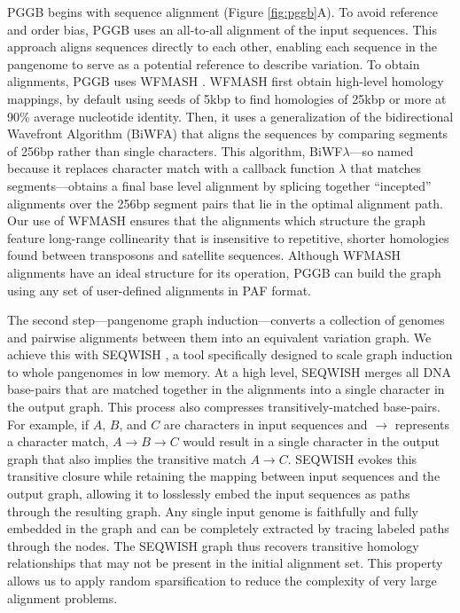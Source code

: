 \documentclass[pdflatex,mathphys]{jnl}%
\theoremstyle{thmstyleone}%
\theoremstyle{thmstyletwo}%
\theoremstyle{thmstylethree}%
\begin{document}
PGGB begins with sequence alignment (Figure \ref{fig:pggb}A).
To avoid reference and order bias, PGGB uses an all-to-all alignment of the input sequences.
This approach aligns sequences directly to each other, enabling each sequence in the pangenome to serve as a potential reference to describe variation.
To obtain alignments, PGGB uses WFMASH \cite{Guarracino_wfmash_2021}.
WFMASH first %
obtain high-level homology mappings, by default using seeds of 5kbp to find homologies of 25kbp or more at 90\% average nucleotide identity.
Then, it uses a generalization of the bidirectional Wavefront Algorithm (BiWFA) \cite{Marco_Sola_2023} that aligns the sequences by comparing segments of 256bp rather than single characters.
This algorithm, BiWF$\lambda$---so named because it replaces character match with a callback function $\lambda$ that matches segments---obtains a final base level alignment by splicing together ``incepted'' alignments over the 256bp segment pairs that lie in the optimal alignment path.
Our use of WFMASH ensures that the alignments which structure the graph feature long-range collinearity that is insensitive to repetitive, shorter homologies found between transposons and satellite sequences.
Although WFMASH alignments have an ideal structure for its operation, PGGB can build the graph using any set of user-defined alignments in PAF format.

The second step---pangenome graph induction---converts a collection of genomes and pairwise alignments between them into an equivalent variation graph.
We achieve this with SEQWISH \cite{Garrison_seqwish_2022}, a tool specifically designed to scale graph induction to whole pangenomes in low memory.
At a high level, SEQWISH merges all DNA base-pairs that are matched together in the alignments into a single character in the output graph.
This process also compresses transitively-matched base-pairs.
For example, if $A$, $B$, and $C$ are characters in input sequences and $\to$ represents a character match, $A \to B \to C$ would result in a single character in the output graph that also implies the transitive match $A \to C$.
SEQWISH evokes this transitive closure while retaining the mapping between input sequences and the output graph, allowing it to losslessly embed the input sequences as paths through the resulting graph.
Any single input genome is faithfully and fully embedded in the graph and can be completely extracted by tracing labeled paths through the nodes.
The SEQWISH graph thus recovers transitive homology relationships that may not be present in the initial alignment set.
This property allows us to apply random sparsification to reduce the complexity of very large alignment problems.
\end{document}
